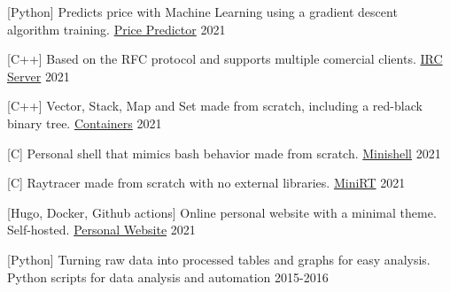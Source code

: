 
\begin{cventries}

  \cventry
    {[Python] Predicts price with Machine Learning using a gradient descent algorithm training.}
    {\href{https://github.com/pruiz-ca/ft_linear_regression}{Price Predictor}}
    {}
    {2021}
    {}

  \cventry
    {[C++] Based on the RFC protocol and supports multiple comercial clients.}
    {\href{https://github.com/pruiz-ca/ft_irc}{IRC Server}}
    {}
    {2021}
    {}

  \cventry
    {[C++] Vector, Stack, Map and Set made from scratch, including a red-black binary tree.}
    {\href{https://github.com/pruiz-ca/ft_irc}{Containers}}
    {}
    {2021}
    {}

  \cventry
    {[C] Personal shell that mimics bash behavior made from scratch.}
    {\href{https://github.com/pruiz-ca/minishell}{Minishell}}
    {}
    {2021}
    {}

  \cventry
    {[C] Raytracer made from scratch with no external libraries.}
    {\href{https://github.com/pruiz-ca/miniRT}{MiniRT}}
    {}
    {2021}
    {}

  \cventry
    {[Hugo, Docker, Github actions] Online personal website with a minimal theme. Self-hosted.}
    {\href{https://github.com/pruiz-ca/pedroruiz.xyz}{Personal Website}}
    {}
    {2021}
    {}

  \cventry
    {[Python] Turning raw data into processed tables and graphs for easy analysis.}
    {Python scripts for data analysis and automation}
    {}
    {2015-2016}
    {}

\end{cventries}
